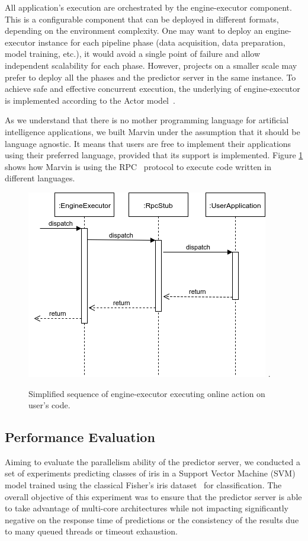 \documentclass[twoside,11pt]{article}
\begin{document}
All application's execution are orchestrated by the engine-executor component. This is a configurable component that can be deployed in different formats, depending on the environment complexity. One may want to deploy an engine-executor instance for each pipeline phase (data acquisition, data preparation, model training, etc.), it would avoid a single point of failure and allow independent scalability for each phase. However, projects on a smaller scale may prefer to deploy all the phases and the predictor server in the same instance. To achieve safe and effective concurrent execution, the underlying of engine-executor is implemented according to the Actor model~\citep{hewitt1973session}.

As we understand that there is no mother programming language for artificial intelligence applications, we built Marvin under the assumption that it should be language agnostic. It means that users are free to implement their applications using their preferred language, provided that its support is implemented. Figure \ref{fig_rpc} shows how Marvin is using the RPC~\citep{srinivasan1995rpc} protocol to execute code written in different languages.

\begin{figure}[h]
\centering
\includegraphics[scale=0.5]{fig/marvin-rpc.png}
\DeclareGraphicsExtensions.
\caption{Simplified sequence of engine-executor executing online action on user's code.}
\label{fig_rpc}
\end{figure}

\subsection{Performance Evaluation}

Aiming to evaluate the parallelism ability of the predictor server, we conducted a set of experiments predicting classes of iris in a Support Vector Machine (SVM)~\citep{hearst1998support} model trained using the classical Fisher's iris dataset~\citep{fisher1936use} for classification. The overall objective of this experiment was to ensure that the predictor server is able to take advantage of multi-core architectures while not impacting significantly negative on the response time of predictions or the consistency of the results due to many queued threads or timeout exhaustion.
\end{document}
